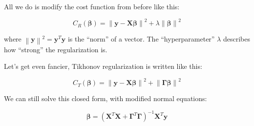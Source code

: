 \documentclass[11pt]{article}
\newcommand\xmtx{\boldsymbol{X}}
\newcommand\betavec{\boldsymbol{\beta}}
\newcommand\yvec{\boldsymbol{y}}
\newcommand\gammtx{\boldsymbol{\Gamma}}
\newcommand{\norm}[1]{\left\lVert#1\right\rVert}
\begin{document}
All we do is modify the cost function from before like this:

\begin{equation}
  C_{R}(\betavec) =  \norm{ \yvec - \xmtx \betavec }^2 + \lambda\norm{\betavec}^2
\end{equation}

where $\norm{\yvec}^2 = \yvec^T \yvec$ is the ``norm'' of a vector. The
``hyperparameter'' $\lambda$ describes how ``strong'' the regularization
is.

Let's get even fancier, Tikhonov regularization is written like this: 

\begin{equation}
  C_{T}(\betavec) =  \norm{ \yvec - \xmtx \betavec }^2 + \norm{\gammtx\betavec}^2
\end{equation}

We can still solve this closed form, with modified normal equations:

\begin{equation}
    \betavec = (\xmtx^T \xmtx + \gammtx^T \gammtx)^{-1} \xmtx^T \yvec
\end{equation}
\end{document}
